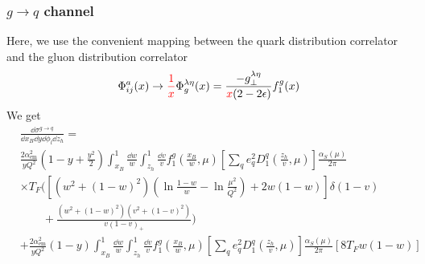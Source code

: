\subsubsection{$g \to q$ channel}
Here, we use the convenient mapping between the quark distribution correlator and the gluon distribution correlator \cite{Ji92,Mulders01,Koike_2020}
\begin{equation}
    \Phi_{ij}^a(x)\to\textcolor{red}{\frac{1}{x}}\Phi^{\lambda\eta}_g(x)=\frac{-g_\perp^{\lambda\eta}}{\textcolor{red}{x}(2-2\epsilon)}f_1^g(x)
\end{equation}
We get
\begin{equation}
    \begin{aligned}
        &\frac{\dd \sigma^{g \to q}}{\dd x_B \dd y \dd \phi_l\dd z_h}=\\
        &\frac{2\alpha_{\text{em}}^2}{yQ^2}\left(1-y+\frac{y^2}{2}\right)\int_{x_B}^1\frac{\dd w}{w}\int_{z_h}^1\frac{\dd v}{v} f_1^g\left(\frac{x_B}{w},\mu\right)\left[\sum_q e_q^2D_1^q\left(\frac{z_h}{v},\mu\right)\right]\frac{\alpha_S(\mu)}{2\pi}\\
        &\times T_F\Bigg(\left[(w^2+(1-w)^2)\left(\ln \frac{1-w}{w}-\ln\frac{\mu^2}{Q^2}\right)+2w(1-w)\right]\delta(1-v)\\
        &\qquad+\frac{(w^2+(1-w)^2)(v^2+(1-v)^2)}{v(1-v)_+}\Bigg)\\
        &+\frac{2\alpha_{\text{em}}^2}{yQ^2}\left(1-y\right)\int_{x_B}^1\frac{\dd w}{w}\int_{z_h}^1\frac{\dd v}{v} f_1^g\left(\frac{x_B}{w},\mu\right)\left[\sum_q e_q^2D_1^q\left(\frac{z_h}{v},\mu\right)\right]\frac{\alpha_S(\mu)}{2\pi}\left[8T_Fw(1-w)\right]
    \end{aligned}
\end{equation}


